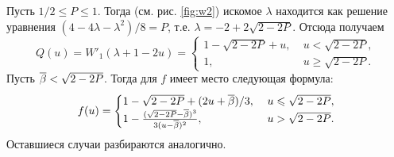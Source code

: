 {\begin{example}
  Пусть $1/2 \leqslant P \leqslant 1$.
  Тогда (см. рис. \ref{fig:w2}) искомое $\lambda$ находится как решение уравнения $(4 - 4\lambda - \lambda^2)/8 = P$, т.е. $\lambda = -2 + 2\sqrt{2 - 2P}$.
  Отсюда получаем
  \begin{equation*}
    Q(u) = W'_1(\lambda + 1 - 2u) = \begin{cases}
      1 - \sqrt{2 - 2P} + u, &\; u < \sqrt{2 - 2P},\\
      1, &\; u \geqslant \sqrt{2 - 2P}.
    \end{cases}
  \end{equation*}
  Пусть ${\overline{\beta}} < \sqrt{2 - 2P}$. Тогда для $f$ имеет место следующая формула:
  \begin{equation*}
    f(u) = \begin{cases}
      1 - \sqrt{2 - 2P} + (2u + {\overline{\beta}})/3, &\; u \leqslant \sqrt{2 - 2P},\\
      1 - \frac{(\sqrt{2 - 2P} - {\overline{\beta}})^3}{3(u - {\overline{\beta}})^2}, &\; u > \sqrt{2 - 2P}.
    \end{cases}
  \end{equation*}
  Оставшиеся случаи разбираются аналогично.
\end{example}
}

